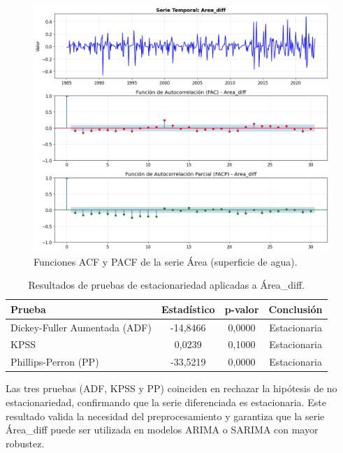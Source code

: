 \begin{figure}[H]
    \centering
    \includegraphics[scale=.42]{Figures/facp_Area_dif.png}
    \caption{Funciones ACF y PACF de la serie Área (superficie de agua).}
    \label{fig:facp_area_dif}
\end{figure}

\begin{table}[H]
    \centering
    \caption{Resultados de pruebas de estacionariedad aplicadas a Área\_diff.}
    \label{tab:ru_area_diff}
    \begin{tabular}{lccc}
        \toprule
        \textbf{Prueba} & \textbf{Estadístico} & \textbf{p-valor} & \textbf{Conclusión} \\
        \midrule
        Dickey-Fuller Aumentada (ADF) & -14,8466 & 0,0000 & Estacionaria \\
        KPSS & 0,0239 & 0,1000 & Estacionaria \\
        Phillips-Perron (PP) & -33,5219 & 0,0000 & Estacionaria \\
        \bottomrule
    \end{tabular}
\end{table}

Las tres pruebas (ADF, KPSS y PP) coinciden en rechazar la hipótesis de no estacionariedad, 
confirmando que la serie diferenciada es estacionaria. Este resultado valida la 
necesidad del preprocesamiento y garantiza que la serie Área\_diff puede ser utilizada en 
modelos ARIMA o SARIMA con mayor robustez. 



